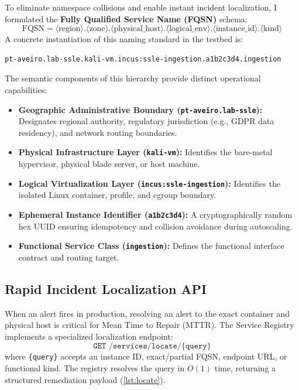 To eliminate namespace collisions and enable instant incident localization, I formulated the \textbf{Fully Qualified Service Name (FQSN)} schema:
\begin{equation}
    \text{FQSN} = \langle\text{region}\rangle.\langle\text{zone}\rangle.\langle\text{physical\_host}\rangle.\langle\text{logical\_env}\rangle.\langle\text{instance\_id}\rangle.\langle\text{kind}\rangle
\end{equation}
A concrete instantiation of this naming standard in the testbed is:
\begin{lstlisting}[language=bash]
pt-aveiro.lab-ssle.kali-vm.incus:ssle-ingestion.a1b2c3d4.ingestion
\end{lstlisting}
The semantic components of this hierarchy provide distinct operational capabilities:
\begin{itemize}
    \item \textbf{Geographic Administrative Boundary (\texttt{pt-aveiro.lab-ssle}):} Designates regional authority, regulatory jurisdiction (e.g., GDPR data residency), and network routing boundaries.
    \item \textbf{Physical Infrastructure Layer (\texttt{kali-vm}):} Identifies the bare-metal hypervisor, physical blade server, or host machine.
    \item \textbf{Logical Virtualization Layer (\texttt{incus:ssle-ingestion}):} Identifies the isolated Linux container, profile, and cgroup boundary.
    \item \textbf{Ephemeral Instance Identifier (\texttt{a1b2c3d4}):} A cryptographically random hex UUID ensuring idempotency and collision avoidance during autoscaling.
    \item \textbf{Functional Service Class (\texttt{ingestion}):} Defines the functional interface contract and routing target.
\end{itemize}

\subsection{Rapid Incident Localization API}
When an alert fires in production, resolving an alert to the exact container and physical host is critical for Mean Time to Repair (MTTR). The Service Registry implements a specialized localization endpoint:
\begin{equation}
    \texttt{GET /services/locate/\{query\}}
\end{equation}
where \texttt{\{query\}} accepts an instance ID, exact/partial FQSN, endpoint URL, or functional kind. The registry resolves the query in $O(1)$ time, returning a structured remediation payload (\cref{lst:locate}).

